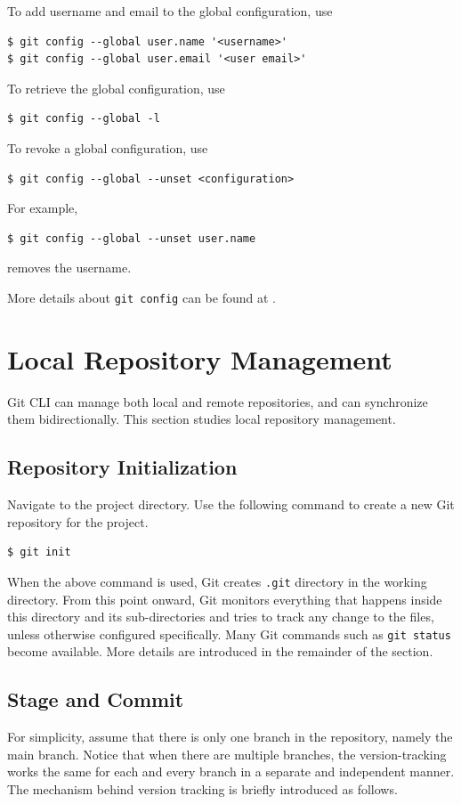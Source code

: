 To add username and email to the global configuration, use
\begin{lstlisting}
$ git config --global user.name '<username>'
$ git config --global user.email '<user email>'
\end{lstlisting}
To retrieve the global configuration, use
\begin{lstlisting}
$ git config --global -l
\end{lstlisting}
To revoke a global configuration, use
\begin{lstlisting}
$ git config --global --unset <configuration>
\end{lstlisting}
For example,
\begin{lstlisting}
$ git config --global --unset user.name
\end{lstlisting}
removes the username.

More details about \verb|git config| can be found at \cite{git2025reference}.

\section{Local Repository Management}

Git CLI can manage both local and remote repositories, and can synchronize them bidirectionally. This section studies local repository management.

\subsection{Repository Initialization}

Navigate to the project directory. Use the following command to create a new Git repository for the project.
\begin{lstlisting}
$ git init
\end{lstlisting}
When the above command is used, Git creates \verb|.git| directory in the working directory. From this point onward, Git monitors everything that happens inside this directory and its sub-directories and tries to track any change to the files, unless otherwise configured specifically. Many Git commands such as \verb|git status| become available. More details are introduced in the remainder of the section.

\subsection{Stage and Commit}

For simplicity, assume that there is only one branch in the repository, namely the main branch. Notice that when there are multiple branches, the version-tracking works the same for each and every branch in a separate and independent manner. The mechanism behind version tracking is briefly introduced as follows.

